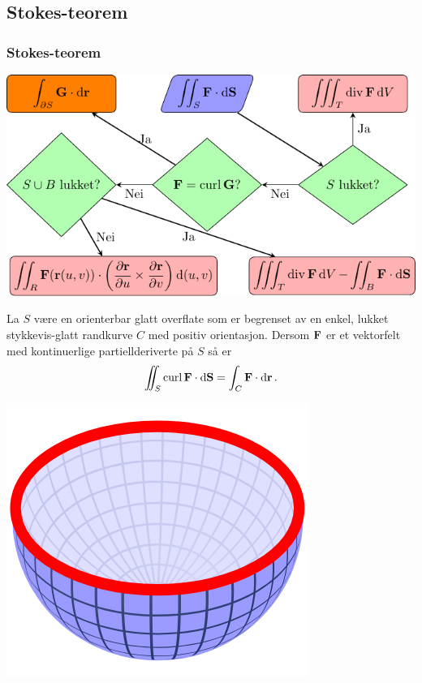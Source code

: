 \begin{frame}
  \subsection{Stokes-teorem}\label{subsec:Stokes-teorem}
  \frametitle{Stokes-teorem}
  \centerline{%
    \includegraphics{../img/flytskjema-overflateintegral-2}
  }

\end{frame}
\begin{frame}
\begin{theorem}
  La $S$ være en orienterbar glatt overflate som er begrenset av en enkel,
  lukket stykkevis-glatt randkurve $C$ med positiv orientasjon. Dersom $\mathbf{F}$ er
  et vektorfelt med kontinuerlige partiellderiverte på $S$ så er
  \begin{equation*}
    \iint_S \operatorname{curl} \mathbf{F} \cdot \mathop{}\! \mathrm{d} \mathbf{S}\mathop{}\! = \int_C \mathbf{F} \cdot \mathop{}\! \mathrm{d} \mathbf{r}\mathop{}\!.
  \end{equation*}
\end{theorem}
\centerline{
  \includegraphics[scale=0.5]{../img/stokes-surface.png}
}
\end{frame}


